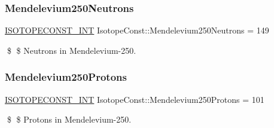 \subsubsection{\texorpdfstring{Mendelevium250\+Neutrons}{Mendelevium250Neutrons}}
{\footnotesize\ttfamily \mbox{\hyperlink{group___isotope_const-_macros_ga5f18360b3e99483a35c32d789e62621c}{I\+S\+O\+T\+O\+P\+E\+C\+O\+N\+S\+T\+\_\+\+I\+NT}} Isotope\+Const\+::\+Mendelevium250\+Neutrons = 149}

\$ \$ Neutrons in Mendelevium-\/250. \mbox{\label{group___isotope_const-_mendelevium-_md250_gaa8e9b75e901e23bd57033901185b0d9d}} 
\subsubsection{\texorpdfstring{Mendelevium250\+Protons}{Mendelevium250Protons}}
{\footnotesize\ttfamily \mbox{\hyperlink{group___isotope_const-_macros_ga5f18360b3e99483a35c32d789e62621c}{I\+S\+O\+T\+O\+P\+E\+C\+O\+N\+S\+T\+\_\+\+I\+NT}} Isotope\+Const\+::\+Mendelevium250\+Protons = 101}

\$ \$ Protons in Mendelevium-\/250. 